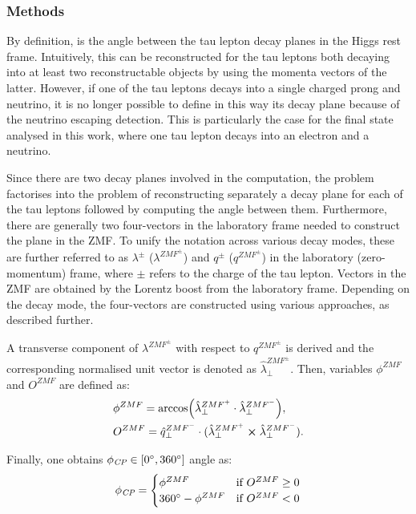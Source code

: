 \subsubsection{Methods}

By definition, \phicp is the angle between the tau lepton decay planes in the Higgs rest frame. Intuitively, this can be reconstructed for the tau leptons both decaying into at least two reconstructable objects by using the momenta vectors of the latter. However, if one of the tau leptons decays into a single charged prong and neutrino, it is no longer possible to define in this way its decay plane because of the neutrino escaping detection. This is particularly the case for the \et final state analysed in this work, where one tau lepton decays into an electron and a neutrino.

Since there are two decay planes involved in the \phicp computation, the problem factorises into the problem of reconstructing separately a decay plane for each of the tau leptons followed by computing the angle between them. Furthermore, there are generally two four-vectors in the laboratory frame needed to construct the plane in the ZMF. To unify the notation across various decay modes, these are further referred to as $\lambda^\pm$ ($\lambda^{ZMF^\pm}$) and $q^\pm$ ($q^{ZMF^\pm}$) in the laboratory (zero-momentum) frame, where $\pm$ refers to the charge of the tau lepton. Vectors in the ZMF are obtained by the Lorentz boost from the laboratory frame. Depending on the decay mode, the four-vectors are constructed using various approaches, as described further.

A transverse component of $\lambda^{ZMF^\pm}$ with respect to $q^{ZMF^\pm}$ is derived and the corresponding normalised unit vector is denoted as $\hat{\lambda}_\perp^{ZMF^\pm}$. Then, variables $\phi^{ZMF}$ and $O^{ZMF}$ are defined as:
\begin{align}
    &\phi^{ZMF} = \arccos(\hat{\lambda}_\perp^{ZMF^+} \cdot \hat{\lambda}_\perp^{ZMF^-}),\\
    &O^{ZMF} = \hat{q}_\perp^{ZMF^-} \cdot (\hat{\lambda}_\perp^{ZMF^+} \cross \hat{\lambda}_\perp^{ZMF^-}).
\end{align}

Finally, one obtains $\phi_{\textit{CP}} \in [0^\circ,360^\circ]$ angle as:
\begin{equation}\label{eq:phicp}
    \phi_{\textit{CP}} = 
    \begin{cases}
    \phi^{ZMF} & \text{if} ~O^{ZMF} \geq 0 \\
    360^\circ - \phi^{ZMF} & \text{if} ~O^{ZMF} < 0
    \end{cases}
\end{equation}

